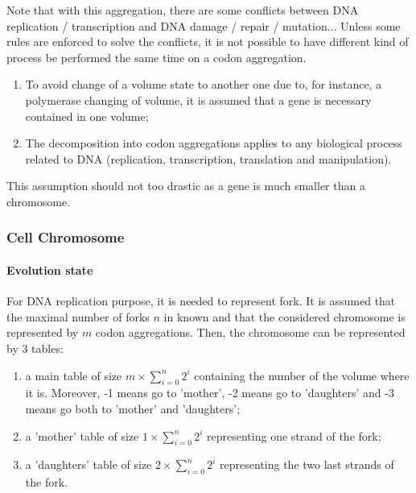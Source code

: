 Note that with this aggregation, there are some conflicts between DNA replication / transcription and DNA damage / repair / mutation... Unless some rules are enforced to solve the conflicts, it is not possible to have different kind of process be performed the same time on a codon aggregation.
\begin{assum}
\begin{enumerate}
  \item To avoid change of a volume state to another one due to, for instance, a polymerase changing of volume, it is assumed that a gene is necessary contained in one volume;
  \item The decomposition into codon aggregations applies to any biological process related to DNA (replication, transcription, translation and manipulation).
\end{enumerate}
\end{assum}
\noindent This assumption should not too drastic as a gene is much smaller than a chromosome.


\subsubsection{Cell Chromosome}
\paragraph{Evolution state} For DNA replication purpose, it is needed to represent fork. It is assumed that the maximal number of forks $n$ in known and that the considered chromosome is represented by $m$ codon aggregations. Then, the chromosome can be represented by 3 tables:
\begin{enumerate}
  \item a main table of size $m \times \sum_{i=0}^n2^i$ containing the number of the volume where it is. Moreover, -1 means go to 'mother', -2 means go to 'daughters' and -3 means go both to 'mother' and 'daughters';
  \item a 'mother' table of size $1 \times \sum_{i=0}^n2^i$ representing one strand of the fork;
  \item a 'daughters' table of size $2 \times \sum_{i=0}^n2^i$ representing the two last strands of the fork.
\end{enumerate}

\medskip

